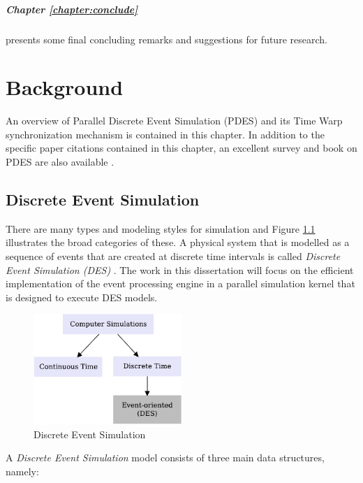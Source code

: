 \documentclass[11pt]{book}
\begin{document}
\paragraph{Chapter \ref{chapter:conclude}} presents some final concluding remarks and suggestions
for future research.

\chapter{Background}\label{chapter:background}

An overview of Parallel Discrete Event Simulation (PDES) and its Time Warp synchronization mechanism is
contained in this chapter.  In addition to the specific paper citations contained in this chapter, an
excellent survey and book on PDES are also available \cite{fujimoto-90,fujimoto-00}.

\section[\textsc{des}]{Discrete Event Simulation}\label{sec:des}

There are many types and modeling styles for simulation and Figure \ref{fig:des} illustrates the broad
categories of these.  A physical system that is modelled as a sequence of events that are created at discrete
time intervals is called \emph{Discrete Event Simulation (DES)} \cite{law-00}.  The work in this dissertation
will focus on the efficient implementation of the event processing engine in a parallel simulation kernel that
is designed to execute DES models.

\begin{figure}
    \centering
    \includegraphics[width=0.5\textwidth]{figures/des.pdf}
    \caption{Discrete Event Simulation}\label{fig:des}
\end{figure}

A \emph{Discrete Event Simulation} model consists of three main data structures, namely:
\end{document}
